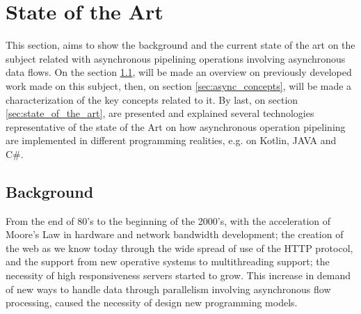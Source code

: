 % 
%  
%
\chapter{State of the Art}
\label{cha:users_manual}

This section, aims to show the background and the current state of the art on the subject related with asynchronous pipelining operations involving asynchronous data flows.  
On the section \ref{sec:related_work}, will be made an overview on previously developed work made on this subject, then, on section \ref{sec:async_concepts}, will be made a characterization of the key concepts related to it. By last, on section \ref{sec:state_of_the_art}, are presented and explained several technologies representative of the state of the Art on how asynchronous operation pipelining are implemented in different programming realities, e.g. on Kotlin, JAVA and C\#. 


\section{Background} %
\label{sec:related_work}


From the end of 80’s to the beginning of the 2000’s, with the acceleration of Moore's Law in hardware and network bandwidth development; the creation of the web as we know today through the wide spread of use of the HTTP protocol, and the support from new operative systems to multithreading support; the necessity of high responsiveness servers started to grow. This increase in demand of new ways to handle data through parallelism involving asynchronous flow processing, caused the necessity of design new programming models. 

